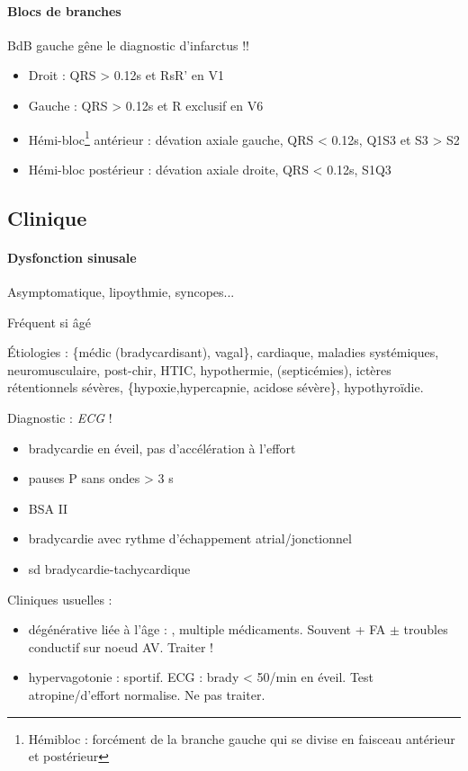 \documentclass{article}
\begin{document}
\paragraph{Blocs de branches}
\danger{} BdB gauche gêne le diagnostic d'infarctus !!
\begin{itemize}
  \item Droit : QRS > 0.12s et RsR' en V1 
  \item Gauche : QRS > 0.12s et R exclusif en V6 
  \item Hémi-bloc\footnote{Hémibloc : forcément de la branche gauche qui se
    divise en faisceau antérieur et postérieur} antérieur : dévation axiale gauche, QRS < 0.12s, Q1S3 et S3 > S2
  \item Hémi-bloc postérieur : dévation axiale droite, QRS < 0.12s, S1Q3

\end{itemize}

\subsection{Clinique}
\paragraph{Dysfonction sinusale}
Asymptomatique, lipoythmie, syncopes...

Fréquent si âgé

Étiologies : \{médic (bradycardisant), vagal\}, cardiaque, maladies systémiques, neuromusculaire,
post-chir, HTIC, hypothermie, (septicémies), ictères rétentionnels sévères,
\{hypoxie,hypercapnie, acidose sévère\}, hypothyroïdie.

Diagnostic : \textit{ECG} ! 
\begin{itemize}
  \item bradycardie en éveil, pas d'accélération à l'effort
  \item pauses P sans ondes > 3 s
  \item BSA II
  \item bradycardie avec rythme d'échappement atrial/jonctionnel
  \item sd bradycardie-tachycardique
\end{itemize}

Cliniques usuelles :
\begin{itemize}
  \item dégénérative liée à l'âge : \female, multiple médicaments. Souvent + FA
    $\pm$ troubles conductif sur noeud AV. Traiter !
  \item hypervagotonie : sportif. ECG : brady < 50/min en éveil. Test
    atropine/d'effort normalise. Ne pas traiter.
\end{itemize}
\end{document}
